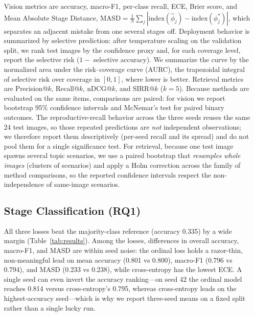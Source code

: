 \documentclass{llncs}
\begin{document}
Vision metrics are accuracy, macro-F1, per-class recall, ECE, Brier score, and Mean Absolute Stage Distance, $\mathrm{MASD}=\frac{1}{N}\sum_j|\mathrm{index}(\hat{\phi}_j)-\mathrm{index}(\phi_j^*)|$, which separates an adjacent mistake from one several stages off. Deployment behavior is summarized by selective prediction: after temperature scaling on the validation split, we rank test images by the confidence proxy and, for each coverage level, report the selective risk ($1-$ selective accuracy). We summarize the curve by the normalized area under the risk--coverage curve (AURC), the trapezoidal integral of selective risk over coverage in $[0,1]$, where lower is better. Retrieval metrics are Precision@$k$, Recall@$k$, nDCG@$k$, and SIRR@$k$ ($k=5$). Because methods are evaluated on the same items, comparisons are paired: for vision we report bootstrap 95\% confidence intervals \cite{efron1993bootstrap} and McNemar's test \cite{mcnemar1947note} for paired binary outcomes. The reproductive-recall behavior across the three seeds reuses the same 24 test images, so those repeated predictions are \emph{not} independent observations; we therefore report them descriptively (per-seed recall and its spread) and do not pool them for a single significance test. For retrieval, because one test image spawns several topic scenarios, we use a paired bootstrap that \emph{resamples whole images} (clusters of scenarios) and apply a Holm correction across the family of method comparisons, so the reported confidence intervals respect the non-independence of same-image scenarios.


\subsection{Stage Classification (RQ1)}

All three losses beat the majority-class reference (accuracy 0.335) by a wide margin (Table~\ref{tab:results}). Among the losses, differences in overall accuracy, macro-F1, and MASD are within seed noise: the ordinal loss holds a razor-thin, non-meaningful lead on mean accuracy (0.801 vs 0.800), macro-F1 (0.796 vs 0.794), and MASD (0.233 vs 0.238), while cross-entropy has the lowest ECE. A single seed can even invert the accuracy ranking---on seed 42 the ordinal model reaches 0.814 versus cross-entropy's 0.795, whereas cross-entropy leads on the highest-accuracy seed---which is why we report three-seed means on a fixed split rather than a single lucky run.
\end{document}
